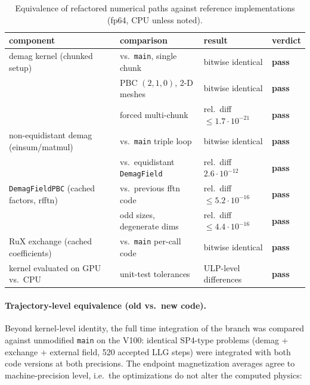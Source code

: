 \documentclass[11pt,a4paper]{article}
\newcommand{\ok}{\textcolor{green!50!black}{\textbf{pass}}}
\begin{document}
\begin{table}[h]\centering\small
\begin{tabular}{llll}
\toprule
component & comparison & result & verdict \\
\midrule
demag kernel (chunked setup) & vs.\ \texttt{main}, single chunk & bitwise identical & \ok \\
 & PBC $(2,1,0)$, 2-D meshes & bitwise identical & \ok \\
 & forced multi-chunk & rel.\ diff $\le 1.7\cdot10^{-21}$ & \ok \\
non-equidistant demag (einsum/matmul) & vs.\ \texttt{main} triple loop & bitwise identical & \ok \\
 & vs.\ equidistant \texttt{DemagField} & rel.\ diff $2.6\cdot10^{-12}$ & \ok \\
\texttt{DemagFieldPBC} (cached factors, rfftn) & vs.\ previous fftn code & rel.\ diff $\le 5.2\cdot10^{-16}$ & \ok \\
 & odd sizes, degenerate dims & rel.\ diff $\le 4.4\cdot10^{-16}$ & \ok \\
RuX exchange (cached coefficients) & vs.\ \texttt{main} per-call code & bitwise identical & \ok \\
kernel evaluated on GPU vs.\ CPU & unit-test tolerances & ULP-level differences & \ok \\
\bottomrule
\end{tabular}
\caption{Equivalence of refactored numerical paths against reference implementations
(fp64, CPU unless noted).}
\end{table}

\paragraph{Trajectory-level equivalence (old vs.\ new code).}
Beyond kernel-level identity, the full time integration of the branch was compared
against unmodified \texttt{main} on the V100: identical SP4-type problems
(demag + exchange + external field, 520 accepted LLG steps) were integrated with
both code versions at both precisions. The endpoint magnetization averages agree
to machine-precision level, i.e.\ the optimizations do not alter the computed
physics:
\end{document}
